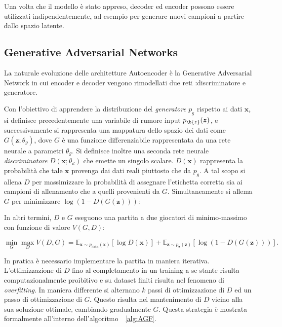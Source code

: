 Una volta che il modello è stato appreso, decoder ed encoder possono essere utilizzati indipendentemente, ad esempio per generare nuovi campioni a partire dallo spazio latente.

\subsection{Generative Adversarial Networks}
La naturale evoluzione delle architetture Autoencoder è la Generative Adversarial Network in cui encoder e decoder vengono rimodellati due reti :discriminatore e generatore. 

Con l'obiettivo di apprendere la distribuzione del \textit{generatore} $p_g$ rispetto ai dati $\bm{x}$, si definisce precedentemente una variabile di rumore input  $p_{\b{z}}(\bm{z})$, e successivamente si rappresenta una mappatura dello spazio dei dati come $G(\bm{z}; \theta_g)$, dove $G$ è una funzione differenziabile rappresentata da una rete neurale a parametri $\theta_g$. Si definisce inoltre una seconda rete neurale \textit{discriminatore}
 $D(\bm{x}; \theta_d)$ che emette un singolo scalare. $D(\bm{x})$ rappresenta la probabilità che tale $\bm{x}$ provenga dai dati reali piuttosto che da $p_g$. 
A tal scopo si allena $D$ per massimizzare la probabilità di assegnare l'etichetta corretta sia ai campioni di allenamento che a quelli provenienti da $G$.
Simultaneamente si allema $G$ per minimizzare $\log(1-D(G(\bm{z})))$:

In altri termini, $D$ e $G$ eseguono una partita a due giocatori di minimo-massimo con funzione di valore $V(G, D)$: 

\begin{equation}
\label{eq:minimaxgame-definition}
\min_G \max_D V(D, G) = \mathbb{E}_{\bm{x} \sim p_{\text{data}}(\bm{x})}[\log D(\bm{x})] + \mathbb{E}_{\bm{z} \sim p_{\bm{z}}(\bm{z})}[\log (1 - D(G(\bm{z})))].
\end{equation}

In pratica è necessario implementare la partita in maniera iterativa. L'ottimizzazione di $D$ fino al completamento in un training a se stante risulta computazionalmente proibitivo e su dataset finiti risulta nel fenomeno di \textit{overfitting}. In maniera differente si alternano $k$ passi di ottimizzazione di $D$ ed un passo di ottimizzazione di $G$. Questo risulta nel mantenimento di $D$ vicino alla sua soluzione ottimale, cambiando gradualmente $G$. Questa strategia è mostrata formalmente all'interno dell'algoritmo~~\ref{alg:AGF}.

